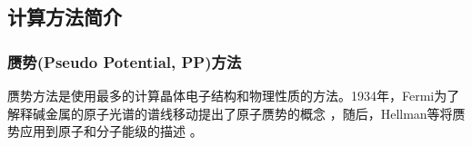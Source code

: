 {%
%
\subsection{计算方法简介}
\subsubsection{赝势(Pseudo Potential, PP)方法}
赝势方法是使用最多的计算晶体电子结构和物理性质的方法。1934年，Fermi为了解释碱金属的原子光谱的谱线移动提出了原子赝势的概念%
，随后，Hellman等将赝势应用到原子和分子能级的描述%
。

}
